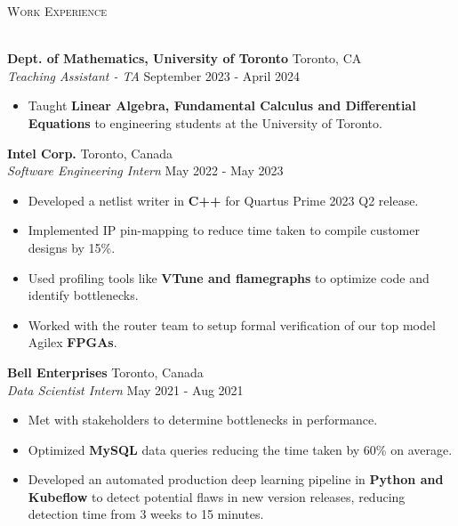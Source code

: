 \documentclass[a4paper]{article}
\newcommand{\lineunder} {
    \vspace*{-8pt} \\
    \hspace*{-18pt} \hrulefill \\
}
\newcommand{\header} [1] {
    {\hspace*{-18pt}\vspace*{6pt} \textsc{#1}}
    \vspace*{-6pt} \lineunder
}
\begin{document}
\header{Work Experience}
\vspace{1mm}

\textbf{Dept. of Mathematics, University of Toronto} \hfill Toronto, CA\\
\textit{Teaching Assistant - TA} \hfill September 2023 - April 2024\\
\vspace{-3mm}
\begin{itemize} \itemsep 0.5pt
	\item Taught \textbf{Linear Algebra, Fundamental Calculus and Differential Equations} to engineering students at the University of Toronto.
\end{itemize}

\textbf{Intel Corp.} \hfill Toronto, Canada\\
\textit{Software Engineering Intern} \hfill May 2022 - May 2023\\
\vspace{-3mm}
\begin{itemize} \itemsep 1pt
	\item Developed a netlist writer in \textbf{C++} for Quartus Prime 2023 Q2 release.
	\item Implemented IP pin-mapping to reduce time taken to compile customer designs by 15\%.
	\item Used profiling tools like \textbf{VTune and flamegraphs} to optimize code and identify bottlenecks. 
	\item Worked with the router team to setup formal verification of our top model Agilex \textbf{FPGAs}. 
\end{itemize}

\textbf{Bell Enterprises} \hfill Toronto, Canada\\
\textit{Data Scientist Intern} \hfill May 2021 - Aug 2021\\
\vspace{-3mm}
\begin{itemize} \itemsep 1pt
	\item Met with stakeholders to determine bottlenecks in performance. 
	\item Optimized \textbf{MySQL} data queries reducing the time taken by 60\% on average.
	\item Developed an automated production deep learning pipeline in \textbf{Python and Kubeflow} to detect potential flaws in new version releases, reducing detection time from 3 weeks to 15 minutes.
\end{itemize}
\end{document}
